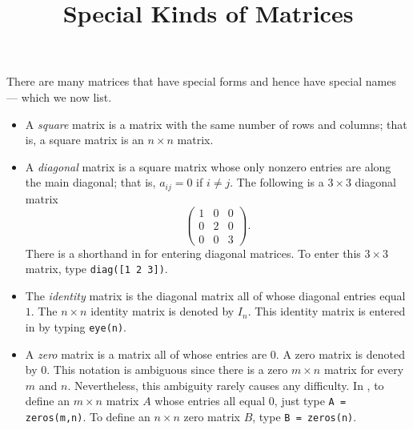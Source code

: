 \documentclass{ximera}
\title{Special Kinds of Matrices}
\begin{document}
\begin{abstract}
\end{abstract}
\maketitle


\label{S:1.3}

There are many matrices that have special forms and hence
have special names --- which we now list.

\begin{itemize}

\item A {\em square\/} matrix is a matrix
with the same number of rows and columns; that is, a square
matrix is an $n\times n$ matrix.

\item A {\em diagonal\/} matrix is a
square matrix whose only
nonzero entries are along the main diagonal; that is, $a_{ij}=0$
if $i\neq j$.  The following is a $3\times 3$ diagonal matrix
\[
\left(\begin{array}{ccc} 1 & 0 & 0 \\ 0 & 2 & 0 \\ 0 & 0 & 3
\end{array} \right).
\]
There is a shorthand in \Matlab for entering diagonal matrices. To
enter this $3\times 3$ matrix, type {\tt diag([1 2 3])}.

\item The {\em identity\/} matrix is the
diagonal matrix all of whose diagonal entries equal $1$.  The
$n\times n$ identity matrix is denoted by $I_n$.  This identity
matrix is entered in \Matlab by typing {\tt eye(n)}.

\item A {\em zero\/} matrix  is a matrix all
of whose entries are $0$. A zero matrix is denoted by $0$.  This
notation is ambiguous since there is a zero $m\times n$ matrix
for every $m$ and $n$.  Nevertheless, this ambiguity rarely
causes any difficulty.  In \Matlabp, to define an $m\times n$
matrix $A$ whose entries all equal $0$, just type
{\tt A = zeros(m,n)}.
To define an $n\times n$ zero matrix $B$, type {\tt B = zeros(n)}.


\end{itemize}
\end{document}
